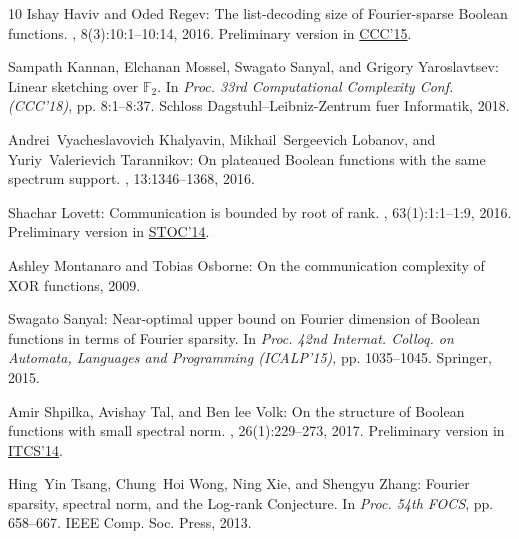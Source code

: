 \documentclass[11pt]{article}
\numberwithin{equation}{section}
\theoremstyle{definition}
\theoremstyle{plain}
\begin{document}
\begin{thebibliography}{10}
{\sc Ishay Haviv and Oded Regev}: The list-decoding size of {F}ourier-sparse
  {B}oolean functions.
, 8(3):10:1--10:14, 2016.
\newblock Preliminary version in
  \href{http://drops.dagstuhl.de/opus/volltexte/2015/5060/}{CCC'15}.

{\sc Sampath Kannan, Elchanan Mossel, Swagato Sanyal, and Grigory
  Yaroslavtsev}: Linear sketching over $\mathbb{F}_2$.
\newblock In {\em Proc. 33rd Computational Complexity Conf. (CCC'18)}, pp.
  8:1--8:37. Schloss Dagstuhl--Leibniz-Zentrum fuer Informatik, 2018.

{\sc Andrei~Vyacheslavovich Khalyavin, Mikhail~Sergeevich Lobanov, and
  Yuriy~Valerievich Tarannikov}: On plateaued {B}oolean functions with the same
  spectrum support.
, 13:1346--1368, 2016.

{\sc Shachar Lovett}: Communication is bounded by root of rank.
, 63(1):1:1--1:9, 2016.
\newblock Preliminary version in
  \href{http://doi.org/10.1145/2591796.2591799}{STOC'14}.

{\sc Ashley Montanaro and Tobias Osborne}: On the communication complexity of
  {XOR} functions, 2009.

{\sc Swagato Sanyal}: Near-optimal upper bound on {F}ourier dimension of
  {B}oolean functions in terms of {F}ourier sparsity.
\newblock In {\em Proc. 42nd Internat. Colloq. on Automata, Languages and
  Programming (ICALP'15)}, pp. 1035--1045. Springer, 2015.
\newblock [\epfmtdoi{10.1007/978-3-662-47672-7\_84}]

{\sc Amir Shpilka, Avishay Tal, and Ben lee Volk}: On the structure of
  {B}oolean functions with small spectral norm.
, 26(1):229--273, 2017.
\newblock Preliminary version in
  \href{https://dl.acm.org/citation.cfm?doid=2554797.2554803}{ITCS'14}.

{\sc Hing~Yin Tsang, Chung~Hoi Wong, Ning Xie, and Shengyu Zhang}: Fourier
  sparsity, spectral norm, and the {L}og-rank {C}onjecture.
\newblock In {\em Proc. 54th FOCS}, pp. 658--667. IEEE Comp. Soc. Press, 2013.

\end{thebibliography}
\end{document}
